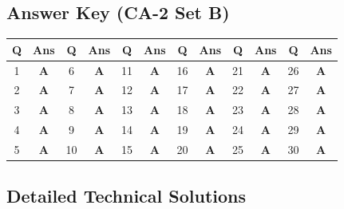 \subsection*{Answer Key (CA-2 Set B)}

\begin{center}
\begin{tabular}{|c|c||c|c||c|c||c|c||c|c||c|c|}
\hline
\textbf{Q} & \textbf{Ans} & \textbf{Q} & \textbf{Ans} & \textbf{Q} & \textbf{Ans} & \textbf{Q} & \textbf{Ans} & \textbf{Q} & \textbf{Ans} & \textbf{Q} & \textbf{Ans} \\
\hline
1 & \textbf{A} & 6 & \textbf{A} & 11 & \textbf{A} & 16 & \textbf{A} & 21 & \textbf{A} & 26 & \textbf{A} \\
2 & \textbf{A} & 7 & \textbf{A} & 12 & \textbf{A} & 17 & \textbf{A} & 22 & \textbf{A} & 27 & \textbf{A} \\
3 & \textbf{A} & 8 & \textbf{A} & 13 & \textbf{A} & 18 & \textbf{A} & 23 & \textbf{A} & 28 & \textbf{A} \\
4 & \textbf{A} & 9 & \textbf{A} & 14 & \textbf{A} & 19 & \textbf{A} & 24 & \textbf{A} & 29 & \textbf{A} \\
5 & \textbf{A} & 10 & \textbf{A} & 15 & \textbf{A} & 20 & \textbf{A} & 25 & \textbf{A} & 30 & \textbf{A} \\
\hline
\end{tabular}
\end{center}

\vspace{3mm}
\subsection*{Detailed Technical Solutions}

